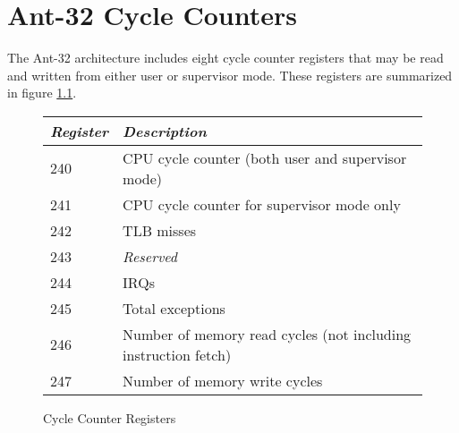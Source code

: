 
\chapter{Ant-32 Cycle Counters}
\label{CycleCounters}

The Ant-32 architecture includes eight cycle counter registers
that may be read and written from either user or supervisor mode.
These registers are summarized in figure \ref{cycle-counter-fig}.

\begin{figure}[ht]
\begin{center}
\caption{\label{cycle-counter-fig} Cycle Counter Registers}

\begin{tabular}{|l|l|}
\hline
{\em Register}	& {\em Description} \\
\hline
\hline
240	& CPU cycle counter (both user and supervisor mode) \\
241	& CPU cycle counter for supervisor mode only \\
242	& TLB misses \\
243	& {\em Reserved} \\
244	& IRQs \\
245	& Total exceptions \\
246	& Number of memory read cycles (not including instruction fetch) \\
247	& Number of memory write cycles\\
\hline
\end{tabular}
\end{center}
\end{figure}

